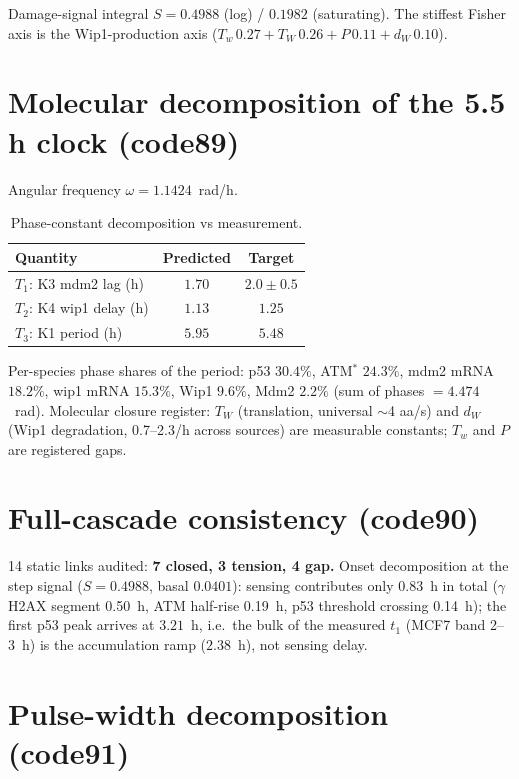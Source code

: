 \documentclass[11pt]{article}
\begin{document}
Damage-signal integral $S=0.4988$ (log) / $0.1982$ (saturating).
The stiffest Fisher axis is the Wip1-production axis
($T_w\,0.27 + T_W\,0.26 + P\,0.11 + d_W\,0.10$).

\section{Molecular decomposition of the 5.5 h clock (code89)}

Angular frequency $\omega = 1.1424$~rad/h.

\begin{table}[h]
\centering\small
\caption{Phase-constant decomposition vs measurement.}
\label{tab:code89}
\begin{tabular}{lcc}
\toprule
Quantity & Predicted & Target \\
\midrule
$T_1$: K3 mdm2 lag (h) & $1.70$ & $2.0 \pm 0.5$ \\
$T_2$: K4 wip1 delay (h) & $1.13$ & $1.25$ \\
$T_3$: K1 period (h) & $5.95$ & $5.48$ \\
\bottomrule
\end{tabular}
\end{table}

Per-species phase shares of the period: p53 $30.4\%$, ATM$^*$ $24.3\%$,
mdm2 mRNA $18.2\%$, wip1 mRNA $15.3\%$, Wip1 $9.6\%$, Mdm2 $2.2\%$
(sum of phases $= 4.474$~rad). Molecular closure register: $T_W$
(translation, universal $\sim$4 aa/s) and $d_W$ (Wip1 degradation,
0.7--2.3/h across sources) are measurable constants; $T_w$ and $P$ are
registered gaps.

\section{Full-cascade consistency (code90)}

14 static links audited: \textbf{7 closed, 3 tension, 4 gap.}
Onset decomposition at the step signal ($S=0.4988$, basal $0.0401$):
sensing contributes only $0.83$~h in total ($\gamma$H2AX segment 0.50~h,
ATM half-rise 0.19~h, p53 threshold crossing 0.14~h); the first p53 peak
arrives at $3.21$~h, i.e.\ the bulk of the measured $t_1$ (MCF7 band
2--3~h) is the accumulation ramp ($2.38$~h), not sensing delay.

\section{Pulse-width decomposition (code91)}
\end{document}
